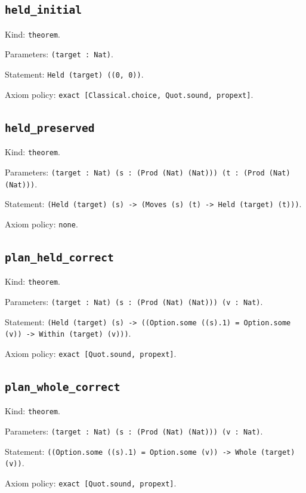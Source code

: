 \documentclass[11pt]{article}
\begin{document}
\subsection*{\texttt{held\_initial}}
\noindent Kind: \texttt{theorem}.\par
\noindent Parameters: \texttt{(target : Nat)}.\par
\noindent Statement: \texttt{Held (target) ((0, 0))}.\par
\noindent Axiom policy: \texttt{exact [Classical.choice, Quot.sound, propext]}.\par
\subsection*{\texttt{held\_preserved}}
\noindent Kind: \texttt{theorem}.\par
\noindent Parameters: \texttt{(target : Nat) (s : (Prod (Nat) (Nat))) (t : (Prod (Nat) (Nat)))}.\par
\noindent Statement: \texttt{(Held (target) (s) -> (Moves (s) (t) -> Held (target) (t)))}.\par
\noindent Axiom policy: \texttt{none}.\par
\subsection*{\texttt{plan\_held\_correct}}
\noindent Kind: \texttt{theorem}.\par
\noindent Parameters: \texttt{(target : Nat) (s : (Prod (Nat) (Nat))) (v : Nat)}.\par
\noindent Statement: \texttt{(Held (target) (s) -> ((Option.some ((s).1) = Option.some (v)) -> Within (target) (v)))}.\par
\noindent Axiom policy: \texttt{exact [Quot.sound, propext]}.\par
\subsection*{\texttt{plan\_whole\_correct}}
\noindent Kind: \texttt{theorem}.\par
\noindent Parameters: \texttt{(target : Nat) (s : (Prod (Nat) (Nat))) (v : Nat)}.\par
\noindent Statement: \texttt{((Option.some ((s).1) = Option.some (v)) -> Whole (target) (v))}.\par
\noindent Axiom policy: \texttt{exact [Quot.sound, propext]}.\par
\end{document}
